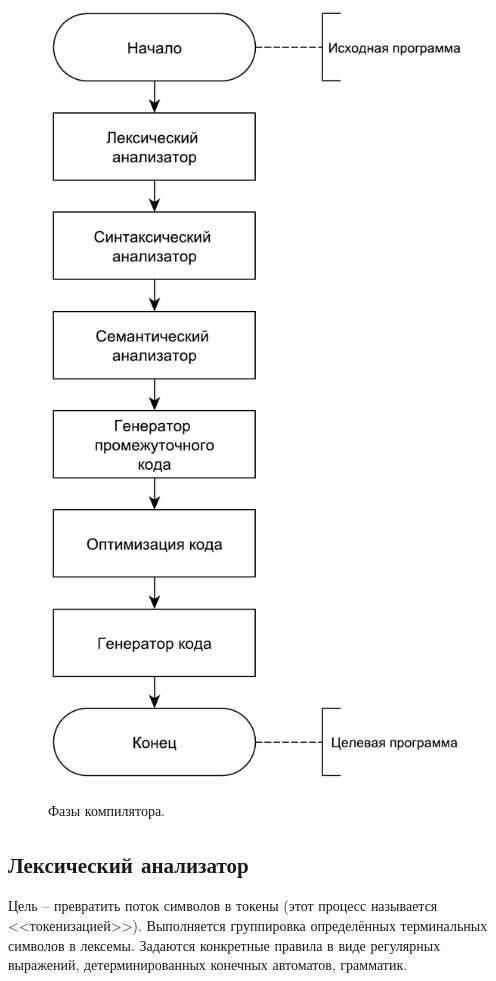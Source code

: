 \begin{figure}[h]
	\begin{center}
		{\includegraphics[scale = 0.53, page=1]{img/phases.pdf}}
		\caption{Фазы компилятора.}
		\label{fig:phases}
	\end{center}
\end{figure}

\subsection{Лексический анализатор}
Цель -- превратить поток символов в токены (этот процесс называется <<токенизацией>>). Выполняется группировка определённых терминальных символов в лексемы. Задаются конкретные правила в виде регулярных выражений, детерминированных конечных автоматов, грамматик. 

